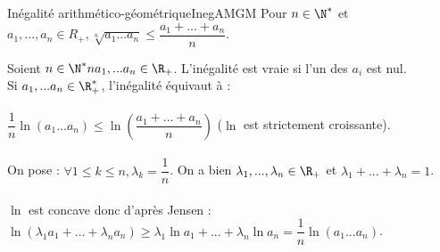 \documentclass[12pt,a4paper]{report}
\begin{document}
\begin{application}{Inégalité arithmético-géométrique}{InegAMGM}
Pour $n \in \N^*$ et $a_1,...,a_n \in R_+, \sqrt[n]{a_1...a_n} \le \dfrac{a_1+...+a_n}{n}$.
	\begin{demo}
	Soient $n \in \N^*n a_1,...a_n \in \R_+$. L'inégalité est vraie si l'un des $a_i$ est nul. \\
	Si $a_1,...a_n \in \R_+^*$, l'inégalité équivaut à : \\ \\
	$\dfrac{1}{n} \ln(a_1...a_n) \le \ln\left(\dfrac{a_1+...+a_n}{n}\right)$ ($\ln$ est strictement croissante). \\ \\
	On pose : $\forall 1 \le k \le n, \lambda_k = \dfrac{1}{n}$. On a bien $\lambda_1,...,\lambda_n \in \R_+$ et $\lambda_1+...+\lambda_n = 1$. \\ \\
	$\ln$ est concave donc d'après Jensen : $\ln(\lambda_1a_1+...+\lambda_na_n) \ge \lambda_1 \ln a_1 + ... + \lambda_n \ln a_n = \dfrac{1}{n} \ln(a_1...a_n)$.
	\end{demo}
\end{application}
\end{document}
